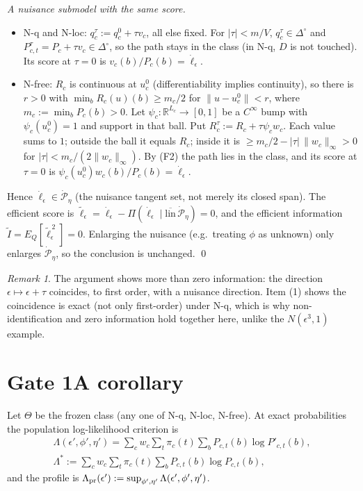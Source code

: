 \documentclass[11pt,a4paper]{article}
\theoremstyle{definition}
\theoremstyle{remark}
\newtheorem{remark}[theorem]{Remark}
\newcommand{\R}{\mathbb{R}}
\newcommand{\simp}{\Delta^{\circ}}
\newcommand{\eps}{\epsilon}
\begin{document}
\emph{A nuisance submodel with the same score.}
\begin{itemize}[leftmargin=1.2em]
\item N-q and N-loc: $q^\tau_c:=q^0_c+\tau v_c$, all else fixed. For
$|\tau|<m/V$, $q^\tau_c\in\simp$ and $P^\tau_{c,t}=P_c+\tau v_c\in\simp$, so the path
stays in the class (in N-q, $D$ is not touched). Its score at $\tau=0$ is
$v_c(b)/P_c(b)=\dot\ell_\eps$.
\item N-free: $R_c$ is continuous at $u^0_c$ (differentiability implies continuity), so
there is $r>0$ with $\min_bR_c(u)(b)\ge m_c/2$ for $\|u-u^0_c\|<r$, where
$m_c:=\min_bP_c(b)>0$. Let $\psi_c:\R^{L_c}\to[0,1]$ be a $C^\infty$ bump with
$\psi_c(u^0_c)=1$ and support in that ball. Put $R^\tau_c:=R_c+\tau\psi_cw_c$. Each
value sums to $1$; outside the ball it equals $R_c$; inside it is $\ge m_c/2-|\tau|\,
\|w_c\|_\infty>0$ for $|\tau|<m_c/(2\|w_c\|_\infty)$. By (F2) the path lies in the
class, and its score at $\tau=0$ is $\psi_c(u^0_c)w_c(b)/P_c(b)=\dot\ell_\eps$.
\end{itemize}
Hence $\dot\ell_\eps\in\dot{\mathcal P}_\eta$ (the nuisance tangent set, not merely its
closed span). The efficient score is
$\tilde\ell_\eps=\dot\ell_\eps-\Pi(\dot\ell_\eps\mid\overline{\mathrm{lin}}\,
\dot{\mathcal P}_\eta)=0$, and the efficient information
$\tilde I=E_Q[\tilde\ell_\eps^{\,2}]=0$. Enlarging the nuisance (e.g.\ treating
$\phi$ as unknown) only enlarges $\dot{\mathcal P}_\eta$, so the conclusion is unchanged.
\qed

\begin{remark}
The argument shows more than zero information: the direction
$\eps\mapsto\eps+\tau$ coincides, to first order, with a nuisance direction. Item (1)
shows the coincidence is exact (not only first-order) under N-q, which is why
non-identification and zero information hold together here, unlike the
$N(\eps^3,1)$ example.
\end{remark}

\section{Gate 1A corollary}

Let $\Theta$ be the frozen class (any one of N-q, N-loc, N-free). At exact
probabilities the population log-likelihood criterion is
\begin{gather*}
\Lambda(\eps',\phi',\eta')=\sum_cw_c\sum_t\pi_c(t)\sum_bP_{c,t}(b)\log P'_{c,t}(b),\\
\Lambda^*:=\sum_cw_c\sum_t\pi_c(t)\sum_bP_{c,t}(b)\log P_{c,t}(b),
\end{gather*}
and the profile is $\Lambda_{\rm pr}(\eps'):=\sup_{\phi',\eta'}\Lambda(\eps',\phi',\eta')$.
\end{document}
